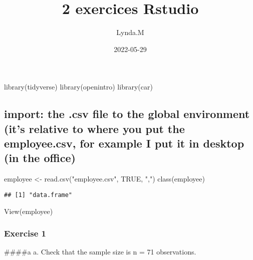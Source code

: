\documentclass[
]{article}
\title{2 exercices Rstudio}
\author{Lynda.M}
\date{2022-05-29}
\newenvironment{Shaded}{\begin{snugshade}}{\end{snugshade}}
\newcommand{\ConstantTok}[1]{\textcolor[rgb]{0.00,0.00,0.00}{#1}}
\newcommand{\FunctionTok}[1]{\textcolor[rgb]{0.00,0.00,0.00}{#1}}
\newcommand{\NormalTok}[1]{#1}
\newcommand{\OtherTok}[1]{\textcolor[rgb]{0.56,0.35,0.01}{#1}}
\newcommand{\StringTok}[1]{\textcolor[rgb]{0.31,0.60,0.02}{#1}}
\begin{document}
\maketitle

\begin{Shaded}
\begin{Highlighting}[]
\FunctionTok{library}\NormalTok{(tidyverse)}
\FunctionTok{library}\NormalTok{(openintro)}
\FunctionTok{library}\NormalTok{(car)}
\end{Highlighting}
\end{Shaded}

\hypertarget{import-the-.csv-file-to-the-global-environment-its-relative-to-where-you-put-the-employee.csv-for-example-i-put-it-in-desktop-in-the-office}{%
\subsection{import: the .csv file to the global environment (it's
relative to where you put the employee.csv, for example I put it in
desktop (in the
office)}\label{import-the-.csv-file-to-the-global-environment-its-relative-to-where-you-put-the-employee.csv-for-example-i-put-it-in-desktop-in-the-office}}

\begin{Shaded}
\begin{Highlighting}[]
\NormalTok{employee }\OtherTok{\textless{}{-}} \FunctionTok{read.csv}\NormalTok{(}\StringTok{"employee.csv"}\NormalTok{, }\ConstantTok{TRUE}\NormalTok{, }\StringTok{","}\NormalTok{)}
\FunctionTok{class}\NormalTok{(employee)}
\end{Highlighting}
\end{Shaded}

\begin{verbatim}
## [1] "data.frame"
\end{verbatim}

\begin{Shaded}
\begin{Highlighting}[]
\FunctionTok{View}\NormalTok{(employee)}
\end{Highlighting}
\end{Shaded}

\hypertarget{exercise-1}{%
\subsubsection{Exercise 1}\label{exercise-1}}

\#\#\#\#a a. Check that the sample size is n = 71 observations.
\end{document}
